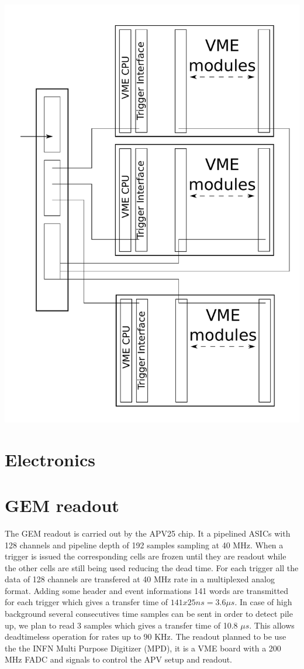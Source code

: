 \documentclass{article}
\begin{document}
\includegraphics[scale=0.55]{figs/TS.pdf}\\
  

\section{Electronics}
\section{GEM readout}
The GEM readout is carried out by the APV25 chip. It a pipelined ASICs with 128 channels and pipeline depth of 192 samples sampling at 40 MHz. When a trigger is issued the corresponding cells are frozen until they are readout while the other cells are still being used reducing the dead time.
For each trigger all the data of 128 channels are transfered at 40 MHz rate in a multiplexed analog format. Adding some header and event informations 141 words are transmitted for each trigger which gives a transfer time of $141x25 ns = 3.6 \mu s $. In case of high background several consecutives time samples can be sent in order to detect pile up, we plan to read 3 samples which gives a transfer time of 10.8 $\mu s$. This allows deadtimeless operation for rates up to 90 KHz. The readout planned to be use the the INFN Multi Purpose Digitizer (MPD), it is a VME board with a 200 MHz FADC and signals to control the APV setup and readout. 
\end{document}

